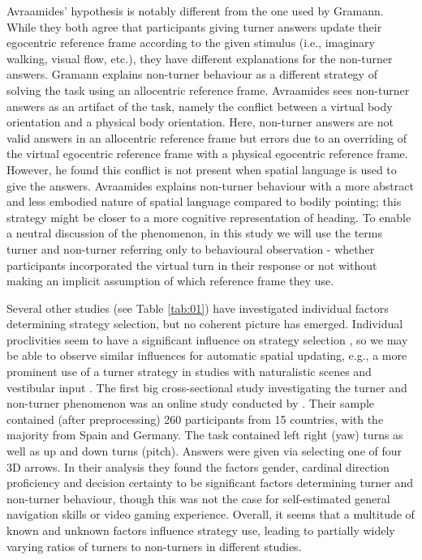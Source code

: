 \documentclass{frontiersSCNS} %
\begin{document}
Avraamides' hypothesis is notably different from the one used by Gramann. While they both agree that participants giving turner answers update their egocentric reference frame according to the given stimulus (i.e., imaginary walking, visual flow, etc.), they have different explanations for the non-turner answers. Gramann explains non-turner behaviour as a different strategy of solving the task using an allocentric reference frame. Avraamides sees non-turner answers as an artifact of the task, namely the conflict between a virtual body orientation and a physical body orientation. Here, non-turner answers are not valid answers in an allocentric reference frame but errors due to an overriding of the virtual egocentric reference frame with a physical egocentric reference frame. However, he found this conflict is not present when spatial language is used to give the answers. Avraamides explains non-turner behaviour with a more abstract and less embodied nature of spatial language compared to bodily pointing; this strategy might be closer to a more cognitive representation of heading.
To enable a neutral discussion of the phenomenon, in this study we will use the terms turner and non-turner referring only to behavioural observation - whether participants incorporated the virtual turn in their response or not without making an implicit assumption of which reference frame they use.

Several other studies (see Table \ref{tab:01}) have investigated individual factors determining strategy selection, but no coherent picture has emerged. Individual proclivities seem to have a significant influence on strategy selection \citep{Gramann2011}, so we may be able to observe similar influences for automatic spatial updating, e.g., a more prominent use of a turner strategy in studies with naturalistic scenes and vestibular input \citep{Sigurdarson}. 
The first big cross-sectional study investigating the turner and non-turner phenomenon was an online study conducted by \citep{Goeke2013}. Their sample contained (after preprocessing) 260 participants from 15 countries, with the majority from Spain and Germany. The task contained left right (yaw) turns as well as up and down turns (pitch). Answers were given via selecting one of four 3D arrows. In their analysis they found the factors gender, cardinal direction proficiency and decision certainty to be significant factors determining turner and non-turner behaviour, though this was not the case for self-estimated general navigation skills or video gaming experience. Overall, it seems that a multitude of known and unknown factors influence strategy use, leading to partially widely varying ratios of turners to non-turners in different studies.
\end{document}
